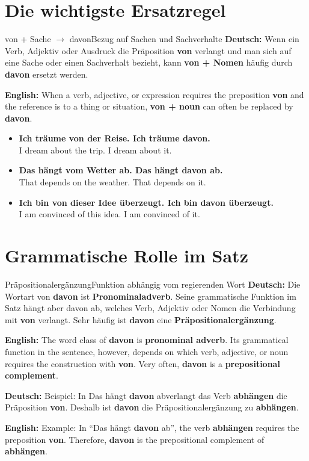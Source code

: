 \documentclass[a4paper,11pt]{article}
\newcommand{\GermanText}[1]{\textbf{Deutsch: }#1\par}
\newcommand{\EnglishText}[1]{{\small\color{SoftGray}\textbf{English: }#1\par}}
\newcommand{\ExampleItem}[2]{\item \textbf{#1}\\{\small\color{SoftGray}#2}}
\begin{document}
    \section{Die wichtigste Ersatzregel}

        \begin{grammarentry}{von + Sache \texorpdfstring{$\rightarrow$}{->} davon}{Bezug auf Sachen und Sachverhalte}
            \GermanText{Wenn ein Verb, Adjektiv oder Ausdruck die Präposition \textbf{von} verlangt und man sich auf eine Sache oder einen Sachverhalt bezieht, kann \textbf{von + Nomen} häufig durch \textbf{davon} ersetzt werden.}
            \EnglishText{When a verb, adjective, or expression requires the preposition \textbf{von} and the reference is to a thing or situation, \textbf{von + noun} can often be replaced by \textbf{davon}.}
        \end{grammarentry}

        \begin{exbox}
            \begin{itemize}
                \ExampleItem{Ich träume von der Reise. \textrightarrow{} Ich träume davon.}{I dream about the trip. \textrightarrow{} I dream about it.}
                \ExampleItem{Das hängt vom Wetter ab. \textrightarrow{} Das hängt davon ab.}{That depends on the weather. \textrightarrow{} That depends on it.}
                \ExampleItem{Ich bin von dieser Idee überzeugt. \textrightarrow{} Ich bin davon überzeugt.}{I am convinced of this idea. \textrightarrow{} I am convinced of it.}
            \end{itemize}
        \end{exbox}

    \section{Grammatische Rolle im Satz}

        \begin{grammarentry}{Präpositionalergänzung}{Funktion abhängig vom regierenden Wort}
            \GermanText{Die Wortart von \textbf{davon} ist \textbf{Pronominaladverb}. Seine grammatische Funktion im Satz hängt aber davon ab, welches Verb, Adjektiv oder Nomen die Verbindung mit \textbf{von} verlangt. Sehr häufig ist \textbf{davon} eine \textbf{Präpositionalergänzung}.}
            \EnglishText{The word class of \textbf{davon} is \textbf{pronominal adverb}. Its grammatical function in the sentence, however, depends on which verb, adjective, or noun requires the construction with \textbf{von}. Very often, \textbf{davon} is a \textbf{prepositional complement}.}

            \GermanText{Beispiel: In \glqq Das hängt \textbf{davon} ab\grqq verlangt das Verb \textbf{abhängen} die Präposition \textbf{von}. Deshalb ist \textbf{davon} die Präpositionalergänzung zu \textbf{abhängen}.}
            \EnglishText{Example: In ``Das hängt \textbf{davon} ab'', the verb \textbf{abhängen} requires the preposition \textbf{von}. Therefore, \textbf{davon} is the prepositional complement of \textbf{abhängen}.}
        \end{grammarentry}
\end{document}
